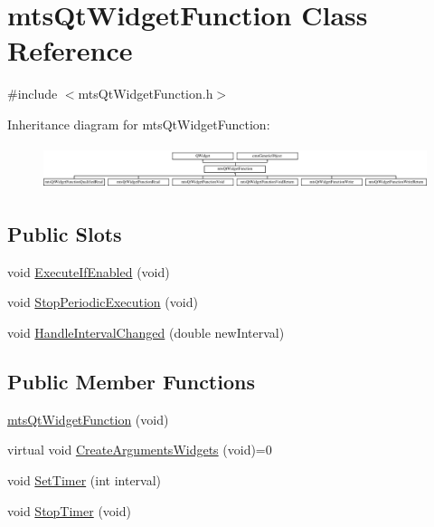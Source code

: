 \hypertarget{classmts_qt_widget_function}{\section{mts\-Qt\-Widget\-Function Class Reference}
\label{classmts_qt_widget_function}
}


{\ttfamily \#include $<$mts\-Qt\-Widget\-Function.\-h$>$}

Inheritance diagram for mts\-Qt\-Widget\-Function\-:\begin{figure}[H]
\begin{center}
\leavevmode
\includegraphics[height=1.284404cm]{d2/d28/classmts_qt_widget_function}
\end{center}
\end{figure}
\subsection*{Public Slots}
\begin{DoxyCompactItemize}
\item 
void \hyperlink{classmts_qt_widget_function_a04e8f574fb0391db00e305c43bc5130f}{Execute\-If\-Enabled} (void)
\item 
void \hyperlink{classmts_qt_widget_function_adba92a5b6f3273d57f7aa1e1960590de}{Stop\-Periodic\-Execution} (void)
\item 
void \hyperlink{classmts_qt_widget_function_a3eea83e5737eb86da0465ce212c877bc}{Handle\-Interval\-Changed} (double new\-Interval)
\end{DoxyCompactItemize}
\subsection*{Public Member Functions}
\begin{DoxyCompactItemize}
\item 
\hyperlink{classmts_qt_widget_function_a4da32c52c82426c6f0dc17d1ec93acfb}{mts\-Qt\-Widget\-Function} (void)
\item 
virtual void \hyperlink{classmts_qt_widget_function_ac094c3a595e05c3ee2a8e030ec6e6d2f}{Create\-Arguments\-Widgets} (void)=0
\item 
void \hyperlink{classmts_qt_widget_function_a07416703ef93e097e5a535fc269d214f}{Set\-Timer} (int interval)
\item 
void \hyperlink{classmts_qt_widget_function_ad5d85054e31d9b925781f469f619c764}{Stop\-Timer} (void)
\end{DoxyCompactItemize}
